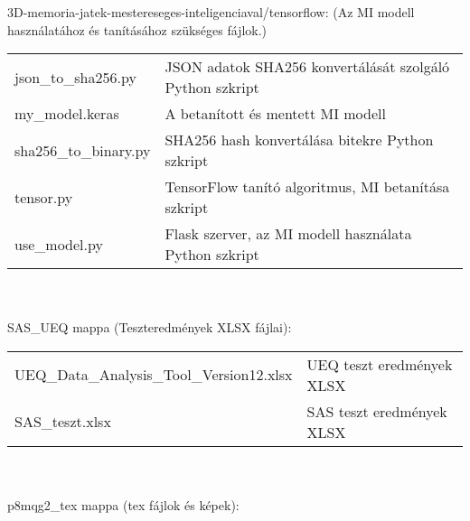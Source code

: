 \noindent 3D-memoria-jatek-mestereseges-inteligenciaval/tensorflow: (Az MI modell használatához és tanításához szükséges fájlok.) \\
\begin{tabular}{l l}
    \quad json\_to\_sha256.py  & \quad JSON adatok SHA256 konvertálását szolgáló Python szkript \\ 
    \quad my\_model.keras  & \quad A betanított és  mentett MI modell \\ 
    \quad sha256\_to\_binary.py  & \quad SHA256 hash konvertálása bitekre Python szkript \\ 
    \quad tensor.py  & \quad TensorFlow tanító algoritmus, MI betanítása szkript \\ 
    \quad use\_model.py  & \quad Flask szerver, az MI modell használata Python szkript\\ 
\end{tabular}
\\
\\
\noindent SAS\_UEQ mappa (Teszteredmények XLSX fájlai): \\
\begin{tabular}{l l}
    \quad UEQ\_Data\_Analysis\_Tool\_Version12.xlsx & \quad UEQ teszt eredmények XLSX \\
    \quad SAS\_teszt.xlsx & \quad SAS teszt eredmények XLSX \\
\end{tabular}
\\
\\
\noindent p8mqg2\_tex mappa (tex fájlok és képek): \\

